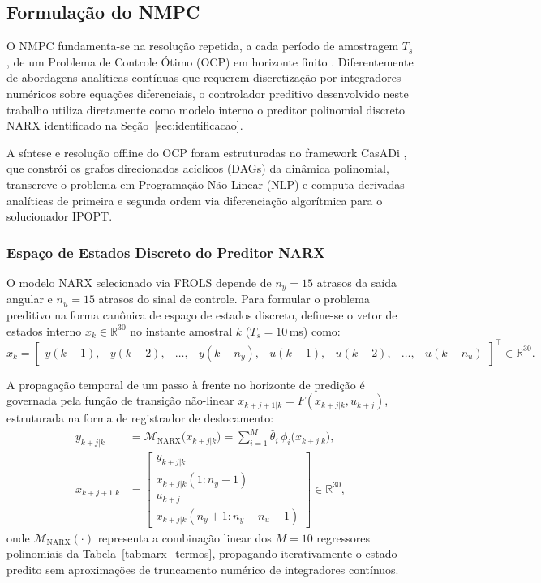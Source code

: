 \subsection{Formulação do NMPC}
\label{subsec:nmpc_ocp}

O NMPC fundamenta-se na resolução repetida, a cada período de amostragem $T_s$, de um Problema de Controle Ótimo (OCP) em horizonte finito \cite{rawlings2017}. Diferentemente de abordagens analíticas contínuas que requerem discretização por integradores numéricos sobre equações diferenciais, o controlador preditivo desenvolvido neste trabalho utiliza diretamente como modelo interno o preditor polinomial discreto NARX identificado na Seção~\ref{sec:identificacao}. 

A síntese e resolução offline do OCP foram estruturadas no framework CasADi \cite{andersson2019}, que constrói os grafos direcionados acíclicos (DAGs) da dinâmica polinomial, transcreve o problema em Programação Não-Linear (NLP) e computa derivadas analíticas de primeira e segunda ordem via diferenciação algorítmica para o solucionador IPOPT.

\subsubsection*{Espaço de Estados Discreto do Preditor NARX}

O modelo NARX selecionado via FROLS depende de $n_y = 15$ atrasos da saída angular e $n_u = 15$ atrasos do sinal de controle. Para formular o problema preditivo na forma canônica de espaço de estados discreto, define-se o vetor de estados interno $x_k \in \mathbb{R}^{30}$ no instante amostral $k$ ($T_s = 10$\,ms) como:
\begin{equation}
    x_k = \begin{bmatrix}
        y(k-1), & y(k-2), & \dots, & y(k-n_y), &
        u(k-1), & u(k-2), & \dots, & u(k-n_u)
    \end{bmatrix}^\top \in \mathbb{R}^{30}.
    \label{eq:estado_narx}
\end{equation}

A propagação temporal de um passo à frente no horizonte de predição é governada pela função de transição não-linear $x_{k+j+1|k} = F(x_{k+j|k}, u_{k+j})$, estruturada na forma de registrador de deslocamento:
\begin{align}
    y_{k+j|k} &= \mathcal{M}_{\text{NARX}}\bigl(x_{k+j|k}\bigr) = \sum_{i=1}^{M} \hat{\theta}_i \, \phi_i\bigl(x_{k+j|k}\bigr), \label{eq:narx_saida_predita} \\
    x_{k+j+1|k} &= \begin{bmatrix}
        y_{k+j|k} \\
        x_{k+j|k}(1 : n_y - 1) \\
        u_{k+j} \\
        x_{k+j|k}(n_y + 1 : n_y + n_u - 1)
    \end{bmatrix} \in \mathbb{R}^{30}, \label{eq:narx_shift}
\end{align}
\noindent onde $\mathcal{M}_{\text{NARX}}(\cdot)$ representa a combinação linear dos $M = 10$ regressores polinomiais da Tabela~\ref{tab:narx_termos}, propagando iterativamente o estado predito sem aproximações de truncamento numérico de integradores contínuos.

